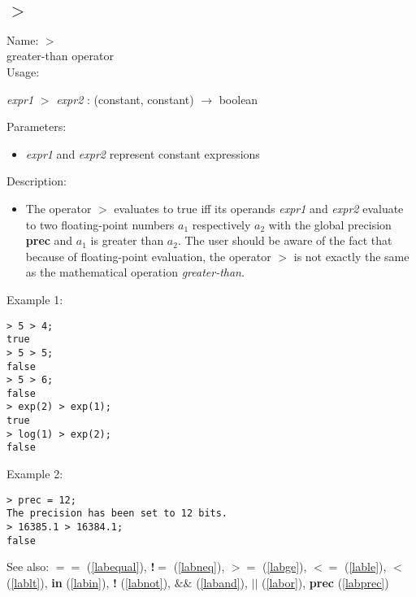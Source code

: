 \subsection{$>$}
\label{labgt}
\noindent Name: \textbf{$>$}\\
greater-than operator\\
\noindent Usage: 
\begin{center}
\emph{expr1} \textbf{$>$} \emph{expr2} : (\textsf{constant}, \textsf{constant}) $\rightarrow$ \textsf{boolean}\\
\end{center}
Parameters: 
\begin{itemize}
\item \emph{expr1} and \emph{expr2} represent constant expressions
\end{itemize}
\noindent Description: \begin{itemize}

\item The operator \textbf{$>$} evaluates to true iff its operands \emph{expr1} and
   \emph{expr2} evaluate to two floating-point numbers $a_1$
   respectively $a_2$ with the global precision \textbf{prec} and
   $a_1$ is greater than $a_2$. The user should
   be aware of the fact that because of floating-point evaluation, the
   operator \textbf{$>$} is not exactly the same as the mathematical
   operation \emph{greater-than}.
\end{itemize}
\noindent Example 1: 
\begin{center}\begin{minipage}{15cm}\begin{Verbatim}[frame=single]
> 5 > 4;
true
> 5 > 5;
false
> 5 > 6;
false
> exp(2) > exp(1);
true
> log(1) > exp(2);
false
\end{Verbatim}
\end{minipage}\end{center}
\noindent Example 2: 
\begin{center}\begin{minipage}{15cm}\begin{Verbatim}[frame=single]
> prec = 12;
The precision has been set to 12 bits.
> 16385.1 > 16384.1;
false
\end{Verbatim}
\end{minipage}\end{center}
See also: \textbf{$==$} (\ref{labequal}), \textbf{!$=$} (\ref{labneq}), \textbf{$>=$} (\ref{labge}), \textbf{$<=$} (\ref{lable}), \textbf{$<$} (\ref{lablt}), \textbf{in} (\ref{labin}), \textbf{!} (\ref{labnot}), \textbf{$\&\&$} (\ref{laband}), \textbf{$||$} (\ref{labor}), \textbf{prec} (\ref{labprec})
